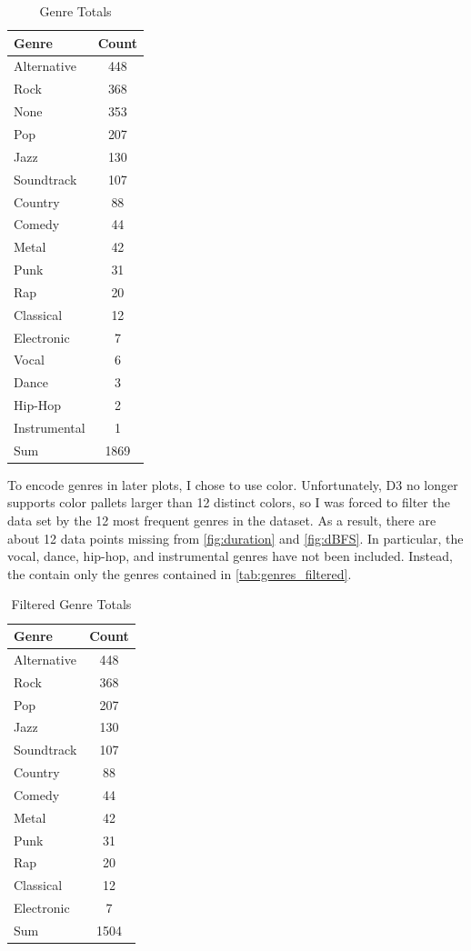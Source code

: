 \documentclass[journal]{vgtc}                %
\begin{document}
\begin{table}[h]
  \caption{Genre Totals}
  \label{tab:genres}
  \scriptsize%
	\centering%
  \begin{tabu}{l c}
  \toprule
    Genre & Count \\
  \midrule
    Alternative & 448 \\
    Rock & 368 \\
    None & 353 \\
    Pop & 207 \\
    Jazz & 130 \\
    Soundtrack & 107 \\
    Country & 88 \\
    Comedy & 44 \\
    Metal & 42 \\
    Punk & 31 \\
    Rap & 20 \\
    Classical & 12 \\
    Electronic & 7 \\
    Vocal & 6 \\
    Dance & 3 \\
    Hip-Hop & 2 \\
    Instrumental & 1 \\
  \midrule
    Sum & 1869 \\
  \bottomrule
  \end{tabu}%
\end{table}

To encode genres in later plots, I chose to use color. Unfortunately, D3 no
longer supports color pallets larger than 12 distinct colors, so I was forced
to filter the data set by the 12 most frequent genres in the dataset. As a
result, there are about 12 data points missing from \autoref{fig:duration}
and \autoref{fig:dBFS}. In particular, the vocal, dance, hip-hop, and
instrumental genres have not been included. Instead, the contain only the genres
contained in \autoref{tab:genres_filtered}.

\begin{table}[h]
  \caption{Filtered Genre Totals}
  \label{tab:genres_filtered}
  \scriptsize%
	\centering%
  \begin{tabu}{l c}
  \toprule
    Genre & Count \\
  \midrule
    Alternative & 448 \\
    Rock & 368 \\
    Pop & 207 \\
    Jazz & 130 \\
    Soundtrack & 107 \\
    Country & 88 \\
    Comedy & 44 \\
    Metal & 42 \\
    Punk & 31 \\
    Rap & 20 \\
    Classical & 12 \\
    Electronic & 7 \\
  \midrule
    Sum & 1504 \\
  \bottomrule
  \end{tabu}%
\end{table}
\end{document}
